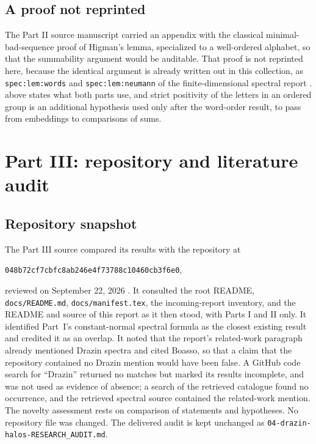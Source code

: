 \documentclass[11pt,a4paper]{article}
\numberwithin{equation}{section}
\theoremstyle{definition}
\theoremstyle{remark}
\newcommand{\commitC}{048b72cf7cbfc8ab246e4f73788c10460cb3f6e0}
\begin{document}
\subsection{A proof not reprinted}\label{ihs:app:higmannote}
The Part II source manuscript carried an appendix with the classical
minimal-bad-sequence proof of Higman's lemma, specialized to a well-ordered
alphabet, so that the summability argument would be auditable. That proof is
not reprinted here, because the identical argument is already written out in
this collection, as \texttt{spec:lem:words} and \texttt{spec:lem:neumann} of
the finite-dimensional spectral report \cite{RepoSpectral}.
 above states what both parts use, and strict
positivity of the letters in an ordered group is an additional hypothesis
used only after the word-order result, to pass from embeddings to
comparisons of sums.

\section{Part III: repository and literature audit}\label{ihs:app:auditC}

\subsection{Repository snapshot}\label{ihs:app:snapshotC}
The Part III source compared its results with the repository at
\begin{center}\small\texttt{\commitC},\end{center}
reviewed on September 22, 2026 \cite{RepoPinC}. It consulted the root
README, \texttt{docs/README.md}, \texttt{docs/manifest.tex}, the
incoming-report inventory, and the README and source of this report as it
then stood, with Parts I and II only. It identified Part~I's
constant-normal spectral formula as the closest existing result and credited
it as an overlap. It noted that the report's related-work paragraph already
mentioned Drazin spectra and cited Boasso, so that a claim that the
repository contained no Drazin mention would have been false. A GitHub code
search for ``Drazin'' returned no matches but marked its results incomplete,
and was not used as evidence of absence; a search of the retrieved catalogue
found no occurrence, and the retrieved spectral source contained the
related-work mention. The novelty assessment rests on comparison of
statements and hypotheses. No repository file was changed. The delivered
audit is kept unchanged as \texttt{04-drazin-halos-RESEARCH\_AUDIT.md}.
\end{document}
